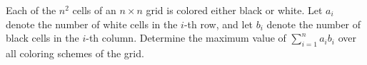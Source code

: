 Each of the $n^2$ cells of an $n\times n$ grid is colored either black or white. Let $a_i$ denote the number of white cells in the $i$-th row, and let $b_i$ denote the number of black cells in the $i$-th column. Determine the maximum value of $\displaystyle\sum_{i=1}^n a_ib_i$ over all coloring schemes of the grid.
